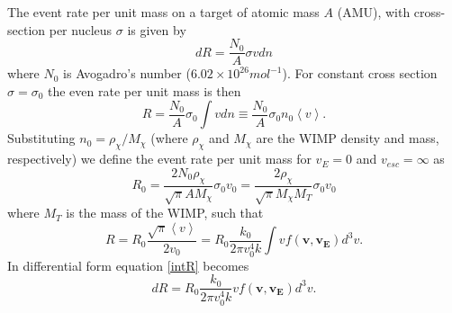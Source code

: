 \documentclass[a4paper,12pt]{article}
\begin{document}
The event rate per unit mass on a target of atomic mass $A$ (AMU), with cross-section per nucleus $\sigma$ is given by
\begin{equation}
dR=\frac{N_0}{A} \sigma v dn
\end{equation}
where $N_0$ is Avogadro's number ($6.02\times10^{26} mol^{-1}$).  For constant cross section $\sigma=\sigma_0$ the even rate per unit mass is then
\begin{equation}
R=\frac{N_0}{A}\sigma_0 \int v dn \equiv \frac{N_0}{A}\sigma_0n_0\left\langle v\right\rangle .
\end{equation}
Substituting $n_0=\rho_{\chi} / M_{\chi}$ (where $\rho_{\chi}$ and $M_{\chi}$ are the WIMP density and mass, respectively) we define the event rate per unit mass for $v_E=0$ and $v_{esc}=\infty$ as
\begin{equation} \label{R-not}
R_0=\frac{2 N_0 \rho_{\chi}}{\sqrt{\pi} A M_{\chi}} \sigma_0 v_0 = \frac{2 \rho_{\chi} }{\sqrt{\pi} M_{\chi} M_T} \sigma_0 v_0
\end{equation}
where $M_T$ is the mass of the WIMP, such that 
\begin{equation} \label{intR}
R=R_0 \frac{\sqrt{\pi} \left \langle v \right \rangle}{2 v_0} = R_0 \frac{k_0}{2 \pi v_0^4 k} \int v f(\mathbf{v},\mathbf{v_E}) d^3v.
\end{equation}
In differential form equation \ref{intR} becomes
\begin{equation} \label{diffR}
dR = R_0 \frac{k_0}{2 \pi v_0^4 k} v f(\mathbf{v},\mathbf{v_E}) d^3v.
\end{equation}
\end{document}

